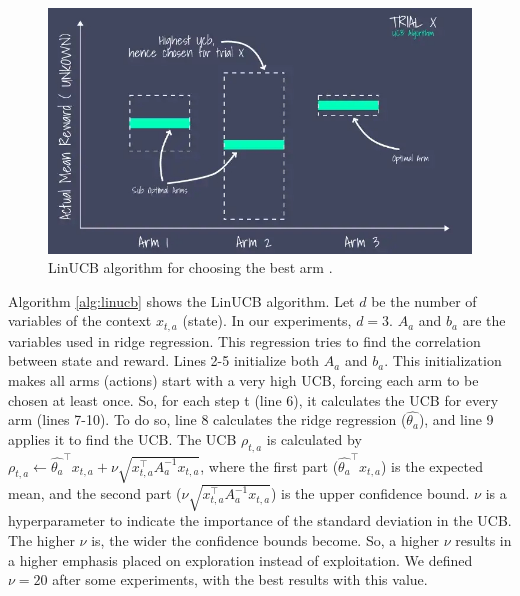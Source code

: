 \begin{figure}[!htb]
    \centering
    \includegraphics[scale=0.58]{Images/Learning_compensations/linucb.jpg}
    \caption{LinUCB algorithm for choosing the best arm \cite{recommender2020}.}
    \label{fig:linucb}
\end{figure}

Algorithm \ref{alg:linucb} shows the LinUCB algorithm. Let $d$ be the number of variables of the context $x_{t,a}$ (state). In our experiments, $d=3$. $A_a$ and $b_a$ are the variables used in ridge regression. This regression tries to find the correlation between state and reward. Lines 2-5 initialize both $A_a$ and $b_a$. This initialization makes all arms (actions) start with a very high UCB, forcing each arm to be chosen at least once. So, for each step t (line 6), it calculates the UCB for every arm (lines 7-10). To do so, line 8 calculates the ridge regression ($\hat{\theta_a}$), and line 9 applies it to find the UCB. The UCB $\rho_{t, a}$ is calculated by $\rho_{t, a} \leftarrow \hat{\theta_a}^\top x_{t,a} + \nu \sqrt{x_{t,a}^\top A_{a}^{-1} x_{t,a}}$, where the first part ($\hat{\theta_a}^\top x_{t,a}$) is the expected mean, and the second part ($\nu \sqrt{x_{t,a}^\top A_{a}^{-1} x_{t,a}}$) is the upper confidence bound. $\nu$ is a hyperparameter to indicate the importance of the standard deviation in the UCB. The higher $\nu$ is, the wider the confidence bounds become. So, a higher $\nu$ results in a higher emphasis placed on exploration instead of exploitation. We defined $\nu = 20$ after some experiments, with the best results with this value.

